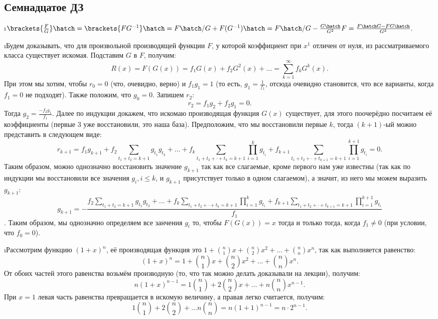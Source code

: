 \subsection{Семнадцатое ДЗ}

\i $\brackets{\frac{F}{G}}\hatch = \brackets{FG^{-1}}\hatch = F\hatch/G + F(G^{-1})\hatch = F\hatch/G -\frac{G\hatch}{G^2}F = \frac{F\hatch G - FG\hatch}{G^2}.$

\i Будем доказывать, что для произвольной производящей функции $F$, у которой коэффициент при $x^1$ отличен от нуля, из рассматриваемого класса существует искомая. Подставим $G$ в $F$, получим:
$$R(x) = F(G(x)) = f_1G(x) + f_2G^2(x) + \ldots = \sum_{k=1}^{\infty} f_kG^k(x).$$
При этом мы хотим, чтобы $r_0 = 0$ (что, очевидно, верно) и $f_1 g_1 = 1$ (то есть, $g_1 = \frac{1}{f_1}$, отсюда очевидно становится, что все варианты, когда $f_1 = 0$ не подходят). Также положим, что $g_0 = 0$. Запишем $r_2$:
$$r_2 = f_1 g_2 + f_2 g_1 = 0.$$
Тогда $g_2 = \frac{-f_2 g_1}{f_1}$. Далее по индукции докажем, что искомаю производящая функция $G(x)$ существует, для этого поочерёдно посчитаем её коэффициенты (первые 3 уже восстановили, это наша база). Предположим, что мы восстановили первые $k$, тогда $(k+1)$-ый можно представить в следующем виде:
$$r_{k+1} = f_1 g_{k+1} + f_2\sum_{t_1 + t_2 = k+1}g_{t_1}g_{t_2} + \ldots + f_k\sum_{t_1 + t_2 + \cdot + t_k = k+1} \prod_{i = 1}^{k} g_{t_i} + f_{k+1}\sum_{t_1 + t_2 + \cdot + t_{k+1} = k+1} \prod_{i = 1}^{k+1} g_{t_i} = 0.$$
Таким образом, можно однозначно восстановить значение $g_{k+1}$ так как все слагаемые, кроме первого нам уже известны (так как по индукции мы восстановили все значения $g_i, i \leq k$, и $g_{k+1}$ присутствует только в одном слагаемом), а значит, из него мы можем выразить $g_{k+1}$:
$$g_{k+1} = -\frac{f_2\displaystyle\sum_{t_1 + t_2 = k+1}g_{t_1}g_{t_2} + \ldots + f_k\sum_{t_1 + t_2 + \cdot + t_k = k+1} \prod_{i = 1}^{k} g_{t_i} + f_{k+1}\sum_{t_1 + t_2 + \cdot + t_{k+1} = k+1} \prod_{i = 1}^{k+1} g_{t_i}}{f_1}$$.
Таким образом, мы однозначно определяем все занчения $g_i$ то, чтобы $F(G(x)) = x$ тогда и только тогда, когда $f_1 \ne 0$ (при условии, что $f_0 = 0$).

\i Рассмотрим функцию $(1+x)^n$, её производящая функция это $1 + \binom{n}{1}x + \binom{n}{2}x^2 + \ldots + \binom{n}{n}x^n$, так как выполняется равенство:
$$(1+x)^n = 1 + \binom{n}{1}x + \binom{n}{2}x^2 + \ldots + \binom{n}{n}x^n.$$
От обоих частей этого равенства возьмём производную (то, что так можно делать доказывали на лекции), получим:
$$n(1+x)^{n-1} = 1\binom{n}{1} + 2\binom{n}{2}x + \ldots + n\binom{n}{n}x^{n-1}.$$
При $x = 1$ левая часть равенства превращается в искомую величину, а правая легко считается, получим:
$$1\binom{n}{1} + 2\binom{n}{2} + \ldots n\binom{n}{n} = n(1+1)^{n-1} = n\cdot 2^{n-1}.$$

